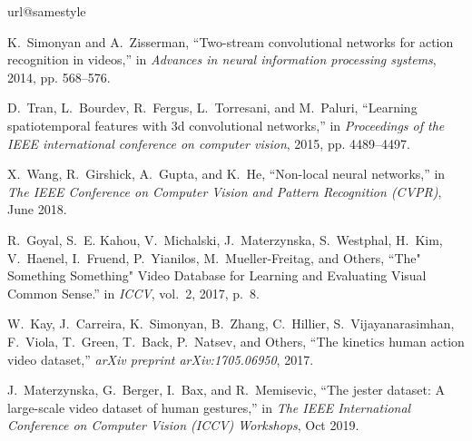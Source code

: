 \documentclass[journal]{IEEEtran}
\begin{document}
\ifCLASSOPTIONcaptionsoff
  \newpage
\fi










\begin{thebibliography}{10}
\providecommand{\url}[1]{#1}
\csname url@samestyle\endcsname
\providecommand{\newblock}{\relax}
\providecommand{\bibinfo}[2]{#2}
\providecommand{\BIBentrySTDinterwordspacing}{\spaceskip=0pt\relax}
\providecommand{\BIBentryALTinterwordstretchfactor}{4}
\providecommand{\BIBentryALTinterwordspacing}{\spaceskip=\fontdimen2\font plus
\BIBentryALTinterwordstretchfactor\fontdimen3\font minus
  \fontdimen4\font\relax}
\providecommand{\BIBforeignlanguage}[2]{{\expandafter\ifx\csname l@#1\endcsname\relax
\typeout{** WARNING: IEEEtran.bst: No hyphenation pattern has been}\typeout{** loaded for the language `#1'. Using the pattern for}\typeout{** the default language instead.}\else
\language=\csname l@#1\endcsname
\fi
#2}}
\providecommand{\BIBdecl}{\relax}
\BIBdecl

K.~Simonyan and A.~Zisserman, ``{Two-stream convolutional networks for action
  recognition in videos},'' in \emph{Advances in neural information processing
  systems}, 2014, pp. 568--576.

D.~Tran, L.~Bourdev, R.~Fergus, L.~Torresani, and M.~Paluri, ``{Learning
  spatiotemporal features with 3d convolutional networks},'' in
  \emph{Proceedings of the IEEE international conference on computer vision},
  2015, pp. 4489--4497.

X.~Wang, R.~Girshick, A.~Gupta, and K.~He, ``Non-local neural networks,'' in
  \emph{The IEEE Conference on Computer Vision and Pattern Recognition (CVPR)},
  June 2018.

R.~Goyal, S.~E. Kahou, V.~Michalski, J.~Materzynska, S.~Westphal, H.~Kim,
  V.~Haenel, I.~Fruend, P.~Yianilos, M.~Mueller-Freitag, and Others, ``{The"
  Something Something" Video Database for Learning and Evaluating Visual Common
  Sense.}'' in \emph{ICCV}, vol.~2, 2017, p.~8.

W.~Kay, J.~Carreira, K.~Simonyan, B.~Zhang, C.~Hillier, S.~Vijayanarasimhan,
  F.~Viola, T.~Green, T.~Back, P.~Natsev, and Others, ``{The kinetics human
  action video dataset},'' \emph{arXiv preprint arXiv:1705.06950}, 2017.

J.~Materzynska, G.~Berger, I.~Bax, and R.~Memisevic, ``The jester dataset: A
  large-scale video dataset of human gestures,'' in \emph{The IEEE
  International Conference on Computer Vision (ICCV) Workshops}, Oct 2019.


\end{thebibliography}
\end{document}
